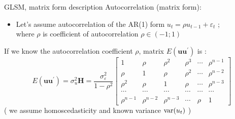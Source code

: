 \documentclass{beamer}
\begin{document}
\begin{frame}{GLSM, matrix form description}
Autocorrelation (matrix form):
\begin{itemize}
\item Let's assume autocorrelation of the AR(1) form $u_t = \rho u_{t-1}+ \varepsilon_t$  ; \\ where $\rho$ is coefficient of autocorrelation $\rho \in (-1; 1)$
\end{itemize}
\vspace{0.2cm}
If we know the autocorrelation coefficient $\rho$,  matrix $E(\boldsymbol{uu}^{\prime})$ is :
$$E(\boldsymbol{uu}^{\prime})= \sigma^2_u\bm{H} = \frac{\sigma^2_{\varepsilon}}{1-\rho^2}
    \begin{bmatrix}
    1&  \rho & \rho^2 & \rho^3 & \cdots & \rho^{n-1}\\
    \rho &  1&  \rho & \rho^2 & \cdots & \rho^{n-2} \\ 
    \rho^2 &  \rho &  1& \rho  & \cdots & \rho^{n-3} \\ 
    \cdots & \cdots & \cdots & \cdots & \cdots & \cdots \\
     \rho^{n-1} & \rho^{n-2} & \rho^{n-3} & \cdots & \rho & 1
\end{bmatrix}$$
( we assume homoscedasticity and known variance $\textnormal{var}(u_t)$ )
\end{frame}
\end{document}
